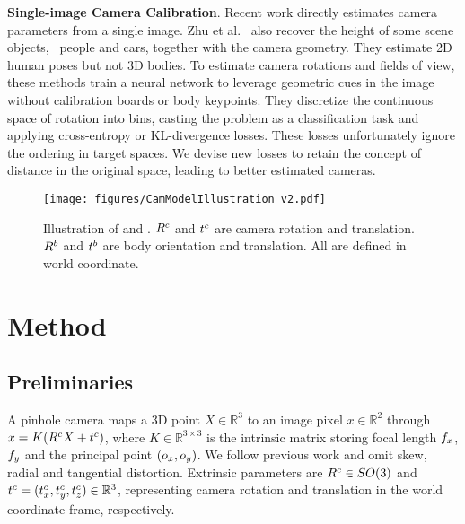 \documentclass[10pt,twocolumn,letterpaper,usenames,dvipsnames]{article}
\begin{document}
\noindent\textbf{Single-image Camera Calibration}.
Recent work \cite{Hold-Geoffroy_2018_CVPR,Kendall_2015_ICCV,workman2016horizon,zhu2020single} directly estimates camera parameters from a single image.
Zhu et al.~\cite{zhu2020single} also recover the height of some scene objects, \eg~people and cars, together with the camera geometry. 
They estimate 2D human poses but not 3D bodies.
To estimate camera rotations and fields of view, these methods train a neural network to leverage geometric cues in the image without calibration boards or body keypoints.
They discretize the continuous space of rotation into bins, casting the problem as a classification task and applying cross-entropy \cite{workman2016horizon} or KL-divergence \cite{Hold-Geoffroy_2018_CVPR,zhu2020single} losses. 
These losses unfortunately ignore the ordering in target spaces.
We devise new losses to retain the concept of distance in the original space, leading to better estimated cameras. 
\begin{figure}[t]
    \centerline{
    \texttt{[image: figures/CamModelIllustration\_v2.pdf]}}
    \vspace{-0.1in}
    \caption{Illustration of \iwcam and \methodname. $R^c$ and $t^c$ are camera rotation and translation. $R^b$ and $t^b$ are body orientation and translation. All are defined in world coordinate.}
    \label{fig:naive_cam}
    \vspace{-2ex}
\end{figure}{}


\section{Method}
\label{methods}

\subsection{Preliminaries}
\label{recap}
A pinhole camera maps a 3D point $X \in \mathbb{R}^3$ to an image pixel $x \in \mathbb{R}^2$ through $x = K(R^c X + t^c)$, where $K \in \mathbb{R}^{3\times 3}$ is the intrinsic matrix storing focal length $f_x$, $f_y$ and the principal point $(o_x, o_y)$. 
We follow  previous work and omit skew, radial and tangential distortion. 
Extrinsic parameters are $R^c \in SO(3)$ and $t^c = (t_x^c, t_y^c, t_z^c) \in \mathbb{R}^3$, representing camera rotation and translation in the world coordinate frame, respectively. 
\end{document}
